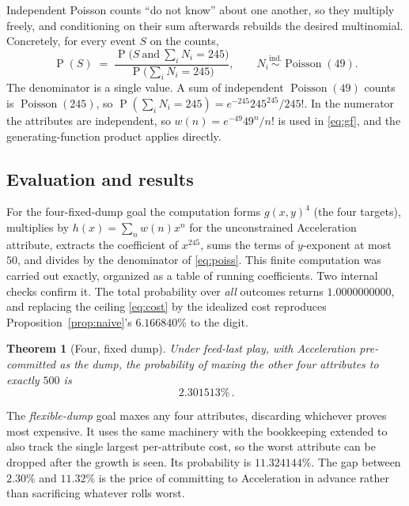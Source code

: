 \documentclass[11pt]{article}
\newtheorem{theorem}{Theorem}
\theoremstyle{remark}
\newcommand{\Prob}{\operatorname{P}}
\newcommand{\Pois}{\operatorname{Poisson}}
\begin{document}
Independent Poisson counts ``do not know'' about one another, so they multiply
freely, and conditioning on their sum afterwards rebuilds the desired multinomial.
Concretely, for
every event $S$ on the counts,
\begin{equation}\label{eq:poiss}
   \Prob(S)\;=\;\frac{\Prob\big(S\ \text{and}\ \textstyle\sum_i N_i=245\big)}
                     {\Prob\big(\textstyle\sum_i N_i=245\big)},
   \qquad N_i\stackrel{\text{ind.}}{\sim}\Pois(49).
\end{equation}
The denominator is a single value. A sum of independent $\Pois(49)$ counts is
$\Pois(245)$, so $\Prob(\sum_i N_i=245)=e^{-245}245^{245}/245!$. In the numerator the
attributes are independent, so $w(n)=e^{-49}49^{n}/n!$ is used in \eqref{eq:gf}, and
the generating-function product applies directly.

\subsection{Evaluation and results}
For the four-fixed-dump goal the computation forms $g(x,y)^4$ (the four targets), multiplies by
$h(x)=\sum_n w(n)x^n$ for the unconstrained Acceleration attribute, extracts the
coefficient of $x^{245}$, sums the terms of $y$-exponent at most $50$, and divides by the
denominator of \eqref{eq:poiss}. This finite computation was carried out exactly,
organized as a table of running coefficients. Two internal checks confirm it. The
total probability over \emph{all} outcomes returns $1.0000000000$, and replacing the
ceiling \eqref{eq:cost} by the idealized cost reproduces Proposition~\ref{prop:naive}'s
$6.166840\%$ to the digit.

\begin{theorem}[Four, fixed dump]\label{thm:main}
Under feed-last play, with Acceleration pre-committed as the dump, the probability of
maxing the other four attributes to exactly $500$ is
\[
   \boxed{\,2.301513\%\,}.
\]
\end{theorem}

The \emph{flexible-dump} goal maxes any four attributes, discarding whichever proves
most expensive. It uses the same machinery with the bookkeeping extended to also track
the single largest per-attribute cost, so the worst attribute can be dropped after the
growth is seen. Its probability is $11.324144\%$. The gap between $2.30\%$ and
$11.32\%$ is the price of committing to Acceleration in advance rather than sacrificing
whatever rolls worst.

\end{document}
